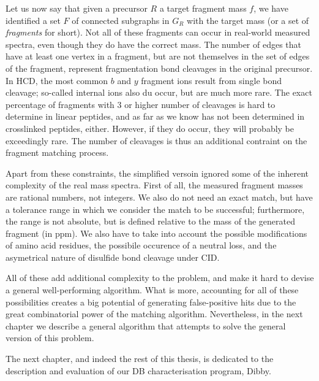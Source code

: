 Let us now say that given a precursor \(R\) a target fragment mass \(f\), we have identified a set \(F\) of connected subgraphs in \(G_R\) with the target mass (or a set of \emph{fragments} for short). Not all of these fragments can occur in real-world measured spectra, even though they do have the correct mass. The number of edges that have at least one vertex in a fragment, but are not themselves in the set of edges of the fragment, represent fragmentation bond cleavages in the original precursor. In HCD, the most common \(b\) and \(y\) fragment ions result from single bond cleavage; so-called internal ions also du occur, but are much more rare. The exact percentage of fragments with 3 or higher number of cleavages is hard to determine in linear peptides, and as far as we know has not been determined in crosslinked peptides, either. However, if they do occur, they will probably be exceedingly rare. The number of cleavages is thus an additional contraint on the fragment matching process.

Apart from these constraints, the simplified versoin ignored some of the inherent complexity of the real mass spectra. First of all, the measured fragment masses are rational numbers, not integers. We also do not need an exact match, but have a tolerance range in which we consider the match to be successful; furthermore, the range is not absolute, but is defined relative to the mass of the generated fragment (in ppm). We also have to take into account the possible modifications of amino acid residues, the possibile occurence of a neutral loss, and the asymetrical nature of disulfide bond cleavage under CID.

All of these add additional complexity to the problem, and make it hard to devise a general well-performing algorithm. What is more, accounting for all of these possibilities creates a big potential of generating false-positive hits due to the great combinatorial power of the matching algorithm. Nevertheless, in the next chapter we describe a general algorithm that attempts to solve the general version of this problem.

The next chapter, and indeed the rest of this thesis, is dedicated to the description and evaluation of our DB characterisation program, Dibby.



